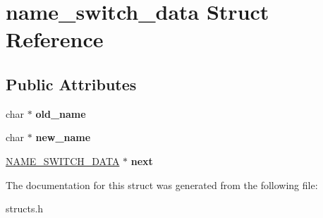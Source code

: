 \hypertarget{structname__switch__data}{\section{name\-\_\-switch\-\_\-data Struct Reference}
\label{structname__switch__data}
}
\subsection*{Public Attributes}
\begin{DoxyCompactItemize}
\item 
\hypertarget{structname__switch__data_a23123960270351da2e88086084782da9}{char $\ast$ {\bfseries old\-\_\-name}}\label{structname__switch__data_a23123960270351da2e88086084782da9}

\item 
\hypertarget{structname__switch__data_a1678ec4303dcc6a0b0b1a23ba293cd53}{char $\ast$ {\bfseries new\-\_\-name}}\label{structname__switch__data_a1678ec4303dcc6a0b0b1a23ba293cd53}

\item 
\hypertarget{structname__switch__data_aa89d7ff142ccd97fa9a68532f7d495fe}{\hyperlink{structname__switch__data}{N\-A\-M\-E\-\_\-\-S\-W\-I\-T\-C\-H\-\_\-\-D\-A\-T\-A} $\ast$ {\bfseries next}}\label{structname__switch__data_aa89d7ff142ccd97fa9a68532f7d495fe}

\end{DoxyCompactItemize}


The documentation for this struct was generated from the following file\-:\begin{DoxyCompactItemize}
\item 
structs.\-h\end{DoxyCompactItemize}

